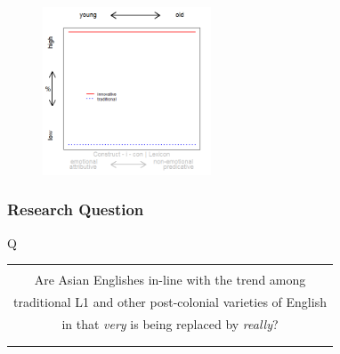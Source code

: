 \documentclass[12pt, table]{beamer}
\begin{document}
\begin{frame}
\begin{minipage}[t]{\linewidth}
\begin{minipage}{.45\linewidth}
\begin{tabular}{cccccccccc }
\end{tabular}
\end{minipage}
\hfill
\begin{minipage}{.45\linewidth}
\begin{figure}
\includegraphics[width=5cm]{images/LangChang22.png}
\end{figure}
\end{minipage}
\end{minipage}
\end{frame}


\begin{frame}
\frametitle{Research Question}
\begin{center}
Q\\[.5cm]
\begin{tabular}{!{\color{uq}\vrule} c !{\color{uq}\vrule}}
\hline\\
Are Asian Englishes in-line with the trend among \\
traditional L1 and other post-colonial varieties of English \\
in that \textit{very} is being replaced by \textit{really}? \\
\\\hline
\end{tabular}
\end{center}
\end{frame}
\end{document}

